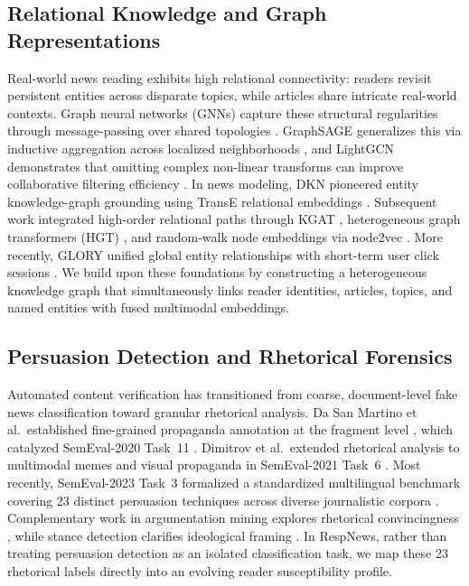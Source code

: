 \documentclass[conference]{IEEEtran}
\begin{document}
\subsection{Relational Knowledge and Graph Representations}
Real-world news reading exhibits high relational connectivity: readers revisit persistent entities across disparate topics, while articles share intricate real-world contexts. Graph neural networks (GNNs) capture these structural regularities through message-passing over shared topologies \cite{kipf_gcn,velickovic_gat}. GraphSAGE generalizes this via inductive aggregation across localized neighborhoods \cite{hamilton_graphsage}, and LightGCN demonstrates that omitting complex non-linear transforms can improve collaborative filtering efficiency \cite{he_lightgcn}. In news modeling, DKN pioneered entity knowledge-graph grounding using TransE relational embeddings \cite{wang_dkn,bordes_transe}. Subsequent work integrated high-order relational paths through KGAT \cite{wang_kgat}, heterogeneous graph transformers (HGT) \cite{hu_hgt}, and random-walk node embeddings via node2vec \cite{grover_node2vec}. More recently, GLORY unified global entity relationships with short-term user click sessions \cite{phan_glory}. We build upon these foundations by constructing a heterogeneous knowledge graph that simultaneously links reader identities, articles, topics, and named entities with fused multimodal embeddings.

\subsection{Persuasion Detection and Rhetorical Forensics}
Automated content verification has transitioned from coarse, document-level fake news classification \cite{shu_fakenewsnet,zubiaga_rumour} toward granular rhetorical analysis. Da San Martino et al.\ established fine-grained propaganda annotation at the fragment level \cite{martino_propaganda}, which catalyzed SemEval-2020 Task~11 \cite{martino_semeval2020}. Dimitrov et al.\ extended rhetorical analysis to multimodal memes and visual propaganda in SemEval-2021 Task~6 \cite{dimitrov_semeval2021}. Most recently, SemEval-2023 Task~3 formalized a standardized multilingual benchmark covering 23 distinct persuasion techniques across diverse journalistic corpora \cite{piskorski_semeval}. Complementary work in argumentation mining explores rhetorical convincingness \cite{habernal_argument}, while stance detection clarifies ideological framing \cite{hardalov_survey}. In RespNews, rather than treating persuasion detection as an isolated classification task, we map these 23 rhetorical labels directly into an evolving reader susceptibility profile.
\end{document}
